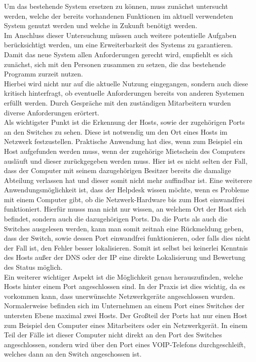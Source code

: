 Um das bestehende System ersetzen zu können, muss zunächst untersucht werden, welche der bereits vorhandenen Funktionen im aktuell verwendeten System genutzt werden und welche in Zukunft benötigt werden.\\
Im Anschluss dieser Untersuchung müssen auch weitere potentielle Aufgaben berücksichtigt werden, um eine Erweiterbarkeit des Systems zu garantieren.
Damit das neue System allen Anforderungen gerecht wird, empfiehlt es sich zunächst, sich mit den Personen zusammen zu setzen, die das bestehende Programm zurzeit nutzen.\\
Hierbei wird nicht nur auf die aktuelle Nutzung eingegangen, sondern auch diese kritisch hinterfragt, ob eventuelle Anforderungen bereits von anderen Systemen erfüllt werden.
Durch Gespräche mit den zuständigen Mitarbeitern wurden diverse Anforderungen erörtert.\\
Als wichtigster Punkt ist die Erkennung der Hosts, sowie der zugehörigen Ports an den Switches zu sehen.
Diese ist notwendig um den Ort eines Hosts im Netzwerk festzustellen. Praktische Anwendung hat dies, wenn zum Beispiel ein Host aufgefunden werden muss, wenn der zugehörige Mietschein des Computers ausläuft und dieser zurückgegeben werden muss.
Hier ist es nicht selten der Fall, dass der Computer mit seinem dazugehörigen Besitzer bereits die damalige Abteilung verlassen hat und dieser somit nicht mehr auffindbar ist.
Eine weiterere Anwendungsmöglichkeit ist, dass der Helpdesk wissen möchte, wenn es Probleme mit einem Computer gibt, ob die Netzwerk-Hardware bis zum Host einwandfrei funktioniert. Hierfür musss man nicht nur wissen, an welchem Ort der Host sich befindet, sondern auch die dazugehörigen Ports.
Da die Ports als auch die Switches ausgelesen werden, kann man somit zeitnah eine Rückmeldung geben, dass der Switch, sowie dessen Port einwandfrei funktionieren, oder falls dies nicht der Fall ist, den Fehler besser lokalisieren. Somit ist selbst bei keinerlei Kenntnis des Hosts außer der DNS oder der IP eine direkte Lokalisierung und Bewertung des Status möglich.\\
Ein weiterer wichtiger Aspekt ist die Möglichkeit genau herauszufinden, welche Hosts hinter einem Port angeschlossen sind.
In der Praxis ist dies wichtig, da es vorkommen kann, dass unerwünschte Netzwerkgeräte angeschlossen wurden.
Normalerweise befinden sich im Unternehmen an einem Port eines Switches der untersten Ebene maximal zwei Hosts. Der Großteil der Ports hat nur einen Host zum Beispiel den Computer eines Mitarbeiters oder ein Netzwerkgerät. In einem Teil der Fälle ist dieser Computer nicht direkt an den Port des Switches angeschlossen, sondern wird über den Port eines VOIP-Telefons durchgeschleift, welches dann an den Switch angeschossen ist.
